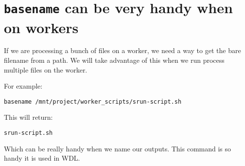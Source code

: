 \documentclass[
  letterpaper,
  DIV=11,
  numbers=noendperiod]{scrreprt}
\begin{document}
\section{\texorpdfstring{\texttt{basename} can be very handy when on
workers}{basename can be very handy when on workers}}\label{basename-can-be-very-handy-when-on-workers}

If we are processing a bunch of files on a worker, we need a way to get
the bare filename from a path. We will take advantage of this when we
run process multiple files on the worker.

For example:

\begin{verbatim}
basename /mnt/project/worker_scripts/srun-script.sh
\end{verbatim}

This will return:

\begin{verbatim}
srun-script.sh
\end{verbatim}

Which can be really handy when we name our outputs. This command is so
handy it is used in WDL.
\end{document}

